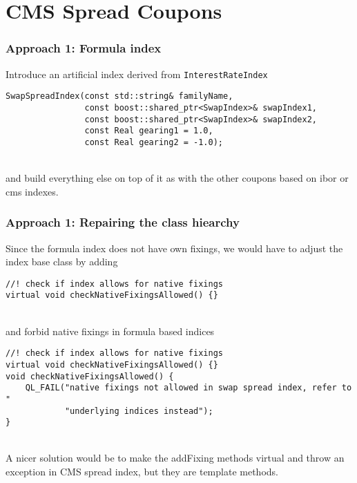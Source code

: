 \documentclass{beamer}
\begin{document}
\section{CMS Spread Coupons}


\begin{frame}[fragile]
\frametitle{Approach 1: Formula index}
Introduce an artificial index derived from \verb+InterestRateIndex+
\vspace{2mm}
\begin{verbatim}
SwapSpreadIndex(const std::string& familyName,
                const boost::shared_ptr<SwapIndex>& swapIndex1,
                const boost::shared_ptr<SwapIndex>& swapIndex2,
                const Real gearing1 = 1.0,
                const Real gearing2 = -1.0);
\end{verbatim}
\\
\vspace{2mm}
and build everything else on top of it as with the other coupons based
on ibor or cms indexes.
\end{frame}

\begin{frame}[fragile]
\frametitle{Approach 1: Repairing the class hiearchy}
Since the formula index does not have own fixings, we would have to
adjust the index base class by adding
\vspace{2mm}
\begin{verbatim}
//! check if index allows for native fixings
virtual void checkNativeFixingsAllowed() {}
\end{verbatim}
\\
\vspace{2mm}
and forbid native fixings in formula based indices
\vspace{2mm}
\begin{verbatim}
//! check if index allows for native fixings
virtual void checkNativeFixingsAllowed() {}
void checkNativeFixingsAllowed() {
    QL_FAIL("native fixings not allowed in swap spread index, refer to "
            "underlying indices instead");
}
\end{verbatim}
\\
\vspace{2mm}
A nicer solution would be to make the addFixing methods virtual and throw
an exception in CMS spread index, but they are template methods.
\end{frame}
\end{document}
